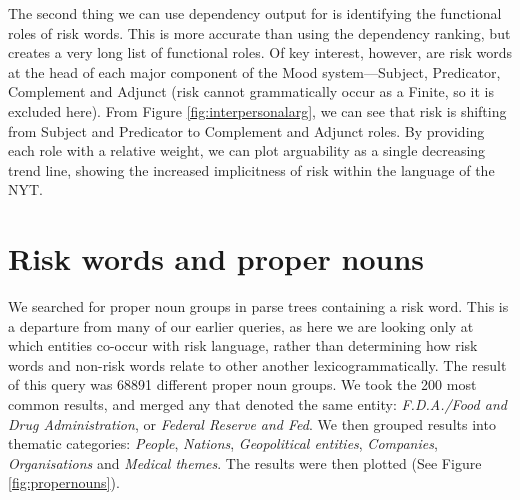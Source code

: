 			The second thing we can use dependency output for is identifying the functional roles of risk words. This is more accurate than using the dependency ranking, but creates a very long list of functional roles. Of key interest, however, are risk words at the head of each major component of the Mood system---Subject, Predicator, Complement and Adjunct (risk cannot grammatically occur as a Finite, so it is excluded here). From Figure \ref{fig:interpersonalarg}, we can see that risk is shifting from Subject and Predicator to Complement and Adjunct roles. By providing each role with a relative weight, we can plot arguability as a single decreasing trend line, showing the increased implicitness of risk within the language of the NYT.


	\section{Risk words and proper nouns}

                We searched for proper noun groups in parse trees containing a risk word. This is a departure from many of our earlier queries, as here we are looking only at which entities co-occur with risk language, rather than determining how risk words and non-risk words relate to other another lexicogrammatically. The result of this query was 68891 different proper noun groups. We took the 200 most common results, and merged any that denoted the same entity: \emph{F.D.A.\slash Food and Drug Administration}, or \emph{Federal Reserve and Fed}. We then grouped results into thematic categories: \emph{People}, \emph{Nations}, \emph{Geopolitical entities}, \emph{Companies}, \emph{Organisations} and \emph{Medical themes}. The results were then plotted (See Figure \ref{fig:propernouns}). 

